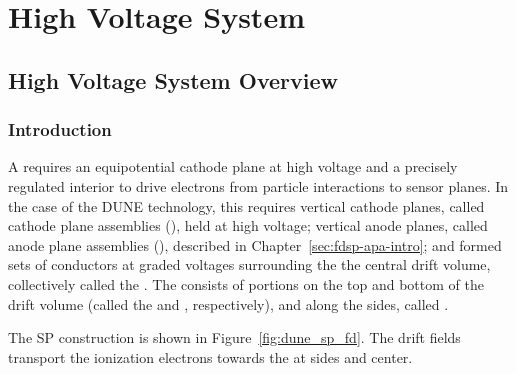 \chapter{High Voltage System}
\label{ch:fdsp-hv}

\section{High Voltage System Overview}
\label{sec:fdsp-hv-ov}


\subsection{Introduction}
\label{sec:fdsp-hv-intro}

A  requires an equipotential cathode plane at high voltage and a precisely regulated interior \efield{} to drive 
electrons from particle interactions to sensor planes.  In the case of the DUNE  technology, 
this requires vertical cathode planes, called cathode plane assemblies (), held at high voltage; vertical anode planes, called anode plane assemblies  (),  described in Chapter~\ref{sec:fdsp-apa-intro}; and formed sets of conductors at graded voltages surrounding the
 the central drift volume, collectively called the . The  consists of portions on the top and bottom  
of the drift volume (called the  and , respectively), and along the sides, called .


The SP  construction is shown in Figure~\ref{fig:dune_sp_fd}.
The  drift fields transport the ionization electrons 
towards the  at sides and center.

